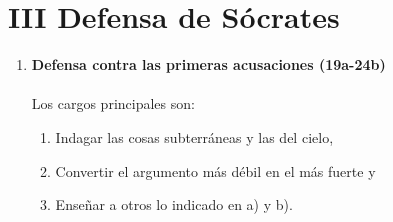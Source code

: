 \section*{\center III Defensa de Sócrates}
\begin{multicols}{2}

    \begin{enumerate}[\bfseries 1.]

	\item \textbf{Defensa contra las primeras acusaciones (19a-24b)}\\\\
	    Los cargos principales son:
	    \begin{enumerate}[\bfseries a.]
		\item Indagar las cosas subterráneas y las del cielo,
		\item Convertir el argumento más débil en el más fuerte y
		\item Enseñar a otros lo indicado en a) y b).
	    \end{enumerate}


\end{enumerate}
\end{multicols}
